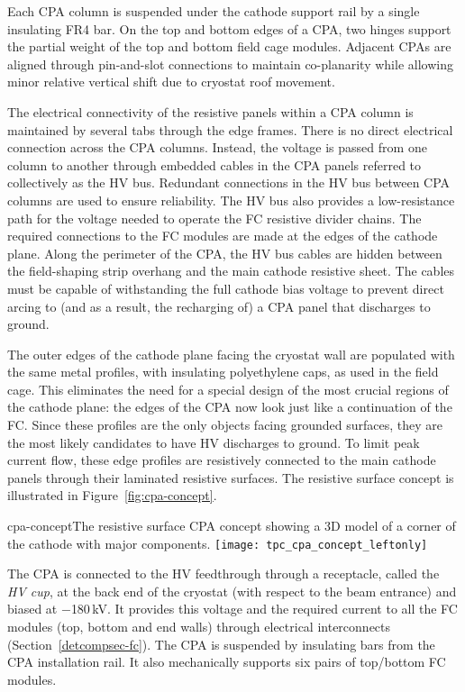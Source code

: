 Each CPA column is suspended under the cathode support rail by a single insulating FR4 bar.  On the top and bottom edges of a CPA, two hinges support the partial weight of the top and bottom field cage modules.   Adjacent CPAs are aligned through pin-and-slot connections to maintain co-planarity while allowing minor relative vertical shift due to cryostat roof movement.

The electrical connectivity of the resistive panels within a CPA column is maintained by several tabs through the edge frames.  There is no direct electrical connection across the CPA columns. 
Instead, the voltage is passed from one column to another through embedded cables in the CPA panels referred to collectively as the HV bus.  Redundant connections in the HV bus between CPA columns are used to ensure reliability.  
The HV bus also provides a low-resistance path for the voltage needed to operate the FC resistive divider chains.
The required connections to the FC modules are made at the edges of the cathode plane. 
Along the perimeter of the CPA, the HV bus cables are hidden between the field-shaping strip overhang and the main cathode resistive sheet.  The cables must be capable of withstanding the full cathode bias voltage to prevent direct arcing to (and as a result, the recharging of) a CPA panel that discharges to ground. 

The outer edges of the cathode plane facing the cryostat wall are populated with the same metal profiles, with insulating polyethylene caps, as used in the field cage.  This eliminates the need for a special design of the most crucial regions of the cathode plane: the edges of the CPA now look just like a continuation of the FC.  Since these profiles are the only objects facing grounded surfaces, they are the most likely candidates to have HV discharges to ground.   To limit peak current flow, these edge profiles are resistively connected to the main cathode panels through their laminated resistive surfaces.  The resistive surface concept is illustrated in Figure~\ref{fig:cpa-concept}.

\begin{cdrfigure}{cpa-concept}{The resistive surface CPA concept showing  
 a 3D model of a corner of the cathode with major components.} 
\texttt{[image: tpc\_cpa\_concept\_leftonly]}
\end{cdrfigure}


The CPA is connected to the HV feedthrough through a receptacle, called the \textit{HV cup}, at the back end of the cryostat (with respect to the beam entrance) and biased at $-$180\,kV.   It provides this voltage and the required current to all the FC modules (top, bottom and end walls) through electrical interconnects (Section~\ref{detcompsec-fc}). The CPA is suspended by insulating bars from the CPA installation rail.  It also mechanically supports six pairs of top/bottom FC modules.


